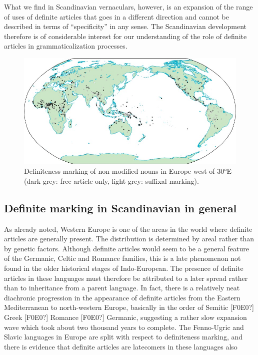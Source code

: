 \z

What we find in Scandinavian vernaculars, however, is an expansion of the range of uses of definite articles that goes in a different direction and cannot be described in terms of “specificity” in any sense. The Scandinavian development therefore is of considerable interest for our understanding of the role of definite articles in grammaticalization processes.

\begin{figure}[h]

\includegraphics{figures_mod/image10}
\caption{Definiteness marking of non-modified nouns in Europe west of 30°E (dark grey: free article only, light grey: suffixal marking).}
\label{map:10}

\end{figure}

\subsection{ Definite marking in Scandinavian in general}
\label{bkm:Ref224380083}

As already noted, Western Europe is one of the areas in the world where definite articles are generally present. The distribution is determined by areal rather than by genetic factors. Although definite articles would seem to be a general feature of the Germanic, Celtic and Romance families, this is a late phenomenon not found in the older historical stages of Indo-European. The presence of definite articles in these languages must therefore be attributed to a later spread rather than to inheritance from a parent language. In fact, there is a relatively neat diachronic progression in the appearance of definite articles from the Eastern Mediterranean to north-western Europe, basically in the order of Semitic [F0E0?] Greek [F0E0?] Romance [F0E0?] Germanic, suggesting a rather slow expansion wave which took about two thousand years to complete. The Fenno-Ugric and Slavic languages in Europe are split with respect to definiteness marking, and there is evidence that definite articles are latecomers in these languages also

